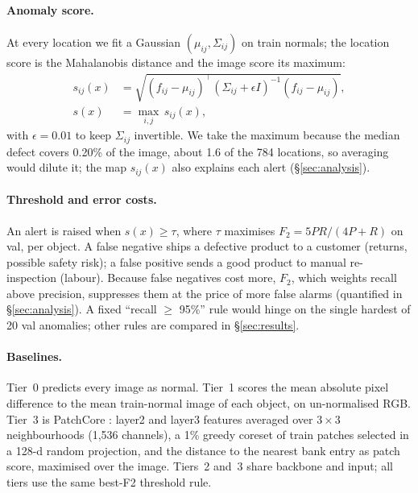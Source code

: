 \paragraph{Anomaly score.}
At every location we fit a Gaussian $(\mu_{ij}, \Sigma_{ij})$ on train normals; the location score is
the Mahalanobis distance and the image score its maximum:
\begin{align}
  s_{ij}(x) &= \sqrt{(f_{ij} - \mu_{ij})^\top (\Sigma_{ij} + \epsilon I)^{-1} (f_{ij} - \mu_{ij})},
  \label{eq:sij} \\
  s(x) &= \max_{i,j}\, s_{ij}(x), \label{eq:sx}
\end{align}
with $\epsilon = 0.01$ to keep $\Sigma_{ij}$ invertible.
We take the maximum because the median defect covers 0.20\% of the image, about 1.6 of the 784
locations, so averaging would dilute it; the map $s_{ij}(x)$ also explains each alert
(\S\ref{sec:analysis}).

\paragraph{Threshold and error costs.}
An alert is raised when $s(x) \ge \tau$, where $\tau$ maximises $F_2 = 5PR/(4P+R)$ on val, per object.
A false negative ships a defective product to a customer (returns, possible safety risk); a false
positive sends a good product to manual re-inspection (labour).
Because false negatives cost more, $F_2$, which weights recall above precision, suppresses them at the
price of more false alarms (quantified in \S\ref{sec:analysis}).
A fixed ``recall $\ge$ 95\%'' rule would hinge on the single hardest of 20 val anomalies; other rules
are compared in \S\ref{sec:results}.

\paragraph{Baselines.}
Tier~0 predicts every image as normal.
Tier~1 scores the mean absolute pixel difference to the mean train-normal image of each object, on
un-normalised RGB.
Tier~3 is PatchCore \citep{roth2022towards}: layer2 and layer3 features averaged over $3 \times 3$
neighbourhoods (1,536 channels), a 1\% greedy coreset of train patches selected in a 128-d random
projection, and the distance to the nearest bank entry as patch score, maximised over the image.
Tiers~2 and~3 share backbone and input; all tiers use the same best-F2 threshold rule.
